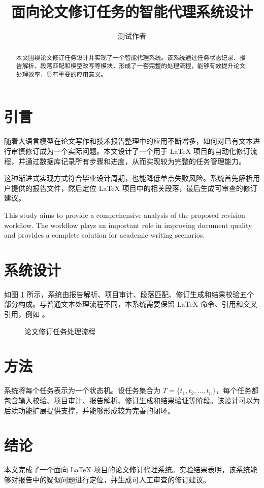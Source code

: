 \documentclass[UTF8]{ctexart}
\title{面向论文修订任务的智能代理系统设计}
\author{测试作者}
\begin{document}
\maketitle

\begin{abstract}
本文围绕论文修订任务设计并实现了一个智能代理系统。该系统通过任务状态记录、报告解析、段落匹配和模型改写等模块，形成了一套完整的处理流程，能够有效提升论文处理效率，具有重要的应用意义。
\end{abstract}

\section{引言}
\label{sec:introduction}

随着大语言模型在论文写作和技术报告整理中的应用不断增多，如何对已有文本进行审慎修订成为一个实际问题。本文设计了一个用于 LaTeX 项目的自动化修订流程，并通过数据库记录所有步骤和进度，从而实现较为完整的任务管理能力。

这种渐进式实现方式符合毕业设计周期，也能降低单点失败风险。系统首先解析用户提供的报告文件，然后定位 LaTeX 项目中的相关段落，最后生成可审查的修订建议。

This study aims to provide a comprehensive analysis of the proposed revision workflow. The workflow plays an important role in improving document quality and provides a complete solution for academic writing scenarios.

\section{系统设计}
\label{sec:design}

如图 \ref{fig:pipeline} 所示，系统由报告解析、项目审计、段落匹配、修订生成和结果校验五个部分构成。与普通文本处理流程不同，本系统需要保留 LaTeX 命令、引用和交叉引用，例如 \cite{smith2024,lee2025}。

\begin{figure}[htbp]
  \centering
  \fbox{\rule{0pt}{4cm}\rule{8cm}{0pt}}
  \caption{论文修订任务处理流程}
  \label{fig:pipeline}
\end{figure}

\section{方法}
\label{sec:method}

系统将每个任务表示为一个状态机。设任务集合为 $T=\{t_1,t_2,\ldots,t_n\}$，每个任务都包含输入校验、项目审计、报告解析、修订生成和结果验证等阶段。该设计可以为后续功能扩展提供支撑，并能够形成较为完善的闭环。

\section{结论}
\label{sec:conclusion}

本文完成了一个面向 LaTeX 项目的论文修订代理系统。实验结果表明，该系统能够对报告中的疑似问题进行定位，并生成可人工审查的修订建议。



\end{document}
